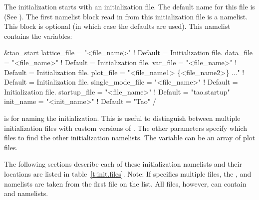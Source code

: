 The initialization starts with an initialization file. The default name for
this file is  (See ).
The first namelist block read in from this initialization file is a 
 namelist. This block is optional (in which case the defaults
are used).  This namelist contains the variables:
\begin{example}
  &tao_start
    lattice_file      = "<file_name>"  ! Default = Initialization file.
    data_file         = "<file_name>"  ! Default = Initialization file.
    var_file          = "<file_name>"  ! Default = Initialization file.
    plot_file         = "<file_name1> \{<file_name2>\} ..."  
                                       ! Default = Initialization file.
    single_mode_file  = "<file_name>"  ! Default = Initialization file.
    startup_file      = "<file_name>"  ! Default = "tao.startup"
    init_name         = "<init_name>"  ! Default = "Tao"
  /
\end{example}
 is for naming the initialization. This is useful to
distinguish between multiple initialization files with custom versions
of \tao. The other parameters specify which files to find the other
initialization namelists. The  variable can be an array
of plot files. 

The following sections describe each of these initialization namelists
and their locations are listed in table~\ref{t:init.files}. Note: If
 specifies multiple files, the ,
 and 
namelists are taken from the first file on the list. All files,
however, can contain  and
 namelists.

